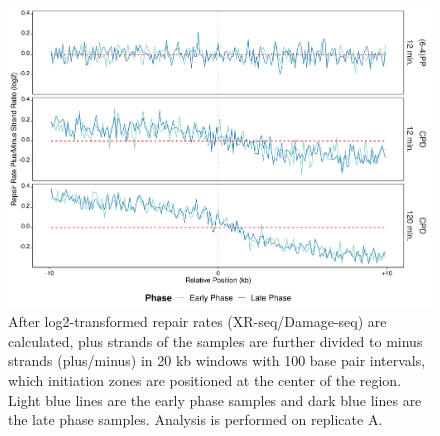 \begin{figure}[H]
\begin{center}
\includegraphics[width=\textwidth]{Chapters/7_appendix/figures/supfig42}
\caption[Repair rate plus/minus ratio of initiation zones in 20 kb (replicate A).]{After log2-transformed repair rates (XR-seq/Damage-seq) are calculated, plus strands of the samples are further divided to minus strands (plus/minus) in 20 kb windows with 100 base pair intervals, which initiation zones are positioned at the center of the region. Light blue lines are the early phase samples and dark blue lines are the late phase samples. Analysis is performed on replicate A.}
\label{supfig:rrpm20inzonesA}
\end{center}
\end{figure}

